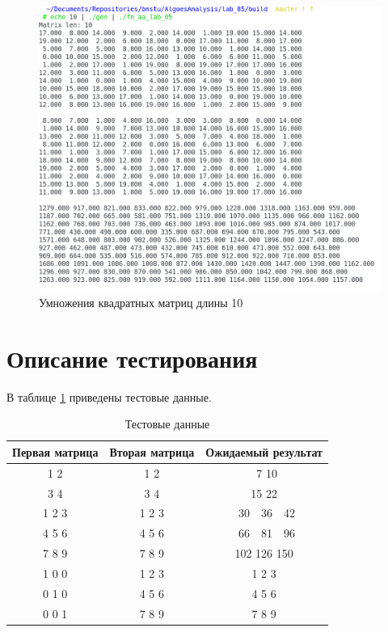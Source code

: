 \begin{figure}[H]
    \centering
    \includegraphics[scale=0.6]{./images/example5.png}
    \caption{Умножения квадратных матриц длины 10}
    \label{img:ex5}
\end{figure}

\section{Описание тестирования}

В таблице \ref{table:test} приведены тестовые данные.

\begin{table}[H]
    \caption{Тестовые данные}
    \label{table:test}
    \centering
    \begin{tabular}{|c|c|c|}
        \hline
        Первая матрица & Вторая матрица & Ожидаемый результат \\
        \hline
        1 2 & 1 2 & \ 7 10 \\
        3 4 & 3 4 & 15 22 \\
        \hline
        1 2 3 & 1 2 3 & \ 30\ \ 36\ \ 42 \\
        4 5 6 & 4 5 6 & \ 66\ \ 81\ \ 96 \\
        7 8 9 & 7 8 9 & 102 126 150 \\
        \hline
        1 0 0 & 1 2 3 & 1 2 3 \\
        0 1 0 & 4 5 6 & 4 5 6 \\
        0 0 1 & 7 8 9 & 7 8 9 \\
        \hline
    \end{tabular}
\end{table}

